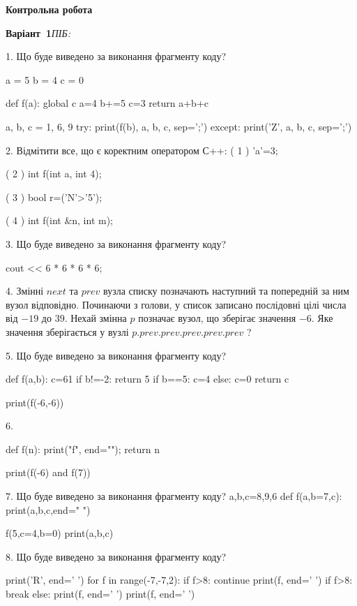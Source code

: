 \documentclass[11pt]{article}
\begin{document}
{\large\textbf{Контрольна робота}}

\textbf{Варіант \No\,1}\hfill \textit{ПІБ:}\,\underline{\hspace{60mm}}
\vspace{4mm}

1. Що буде виведено за виконання фрагменту коду?

a = 5
b = 4
c = 0

def f(a):
global c    a=4
    b+=5
    c=3
    return a+b+c

a, b, c = 1, 6, 9
try:
    print(f(b), a, b, c, sep=';')
except:
    print('Z', a, b, c, sep=';')

2. %
Відмітити все, що є коректним оператором С++:
( 1 ) 'a'=3;

( 2 ) int f(int a, int 4);

( 3 ) bool r=('N'>'5');

( 4 ) int f(int &n, int m);

3. Що буде виведено за виконання фрагменту коду?

cout << 6 * 6 * 6 * 6;

4. 
Змінні $next$ та $prev$ вузла списку позначають наступний та попередній за ним вузол відповідно. Починаючи з голови, у список записано послідовні цілі числа від $-19$ до $39$. Нехай змінна $p$ позначає вузол, що зберігає значення $-6$.
Яке значення зберігається у вузлі $p.prev.prev.prev.prev.prev$ ?

5. Що буде виведено за виконання фрагменту коду?

def f(a,b):
    c=61
    if b!=-2:
        return 5
    if b==5:
         c=4
    else: 
        c=0
    return c

print(f(-6,-6))

6. 

def f(n):
    print("f", end="");
    return n

print(f(-6) and f(7))

7. Що буде виведено за виконання фрагменту коду?
a,b,c=8,9,6
def f(a,b=7,c):
    print(a,b,c,end=" ")

f(5,c=4,b=0)
print(a,b,c)

8. Що буде виведено за виконання фрагменту коду?

print('R', end=' ')
for f in range(-7,-7,2):
    if f>8:
        continue
        print(f, end=' ')
    if f>8:
        break
    else:
        print(f, end=' ')
    print(f, end=' ')
\end{document}
